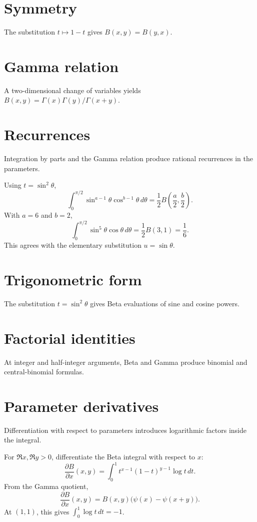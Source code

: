 \section{Symmetry}
The substitution $t\mapsto1-t$ gives $B(x,y)=B(y,x)$.

\section{Gamma relation}
A two-dimensional change of variables yields $B(x,y)=\Gamma(x)\Gamma(y)/\Gamma(x+y)$.

\section{Recurrences}
Integration by parts and the Gamma relation produce rational recurrences in the parameters.

\begin{example}\label{ex:iv20-expand-02}
Using \(t=\sin^2\theta\),
\[
\int_0^{\pi/2}\sin^{a-1}\theta\cos^{b-1}\theta\,d\theta
=\frac12B\!\left(\frac a2,\frac b2\right).
\]
With \(a=6\) and \(b=2\),
\[
\int_0^{\pi/2}\sin^5\theta\cos\theta\,d\theta
=\frac12 B(3,1)=\frac16.
\]
This agrees with the elementary substitution \(u=\sin\theta\).
\end{example}
\section{Trigonometric form}
The substitution $t=\sin^2\theta$ gives Beta evaluations of sine and cosine powers.

\section{Factorial identities}
At integer and half-integer arguments, Beta and Gamma produce binomial and central-binomial formulas.

\section{Parameter derivatives}
Differentiation with respect to parameters introduces logarithmic factors inside the integral.

\begin{example}\label{ex:iv20-expand-03}
For \(\Re x,\Re y>0\), differentiate the Beta integral with respect to \(x\):
\[
\frac{\partial B}{\partial x}(x,y)
=\int_0^1 t^{x-1}(1-t)^{y-1}\log t\,dt.
\]
From the Gamma quotient,
\[
\frac{\partial B}{\partial x}(x,y)
=B(x,y)\bigl(\psi(x)-\psi(x+y)\bigr).
\]
At \((1,1)\), this gives \(\int_0^1\log t\,dt=-1\).
\end{example}
